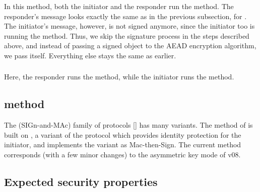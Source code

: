 
\subsubsection{\mStatStat}
In this method, both the initiator and the responder run the \mStat method. The responder's message looks exactly the same as in the previous subsection, for \mSigStat. The initiator's message, however, is not signed anymore, since the initiator too is running the \mStat method. Thus, we skip the signature process in the steps described above, and instead of passing a signed object to the AEAD encryption algorithm, we pass \mMacthree itself. Everything else stays the same as earlier.

\subsubsection{\mStatSig}
Here, the responder runs the \mSig method, while the initiator runs the \mStat method. 


\subsection{\mSigSig method}
The \mSigma (SIGn-and-MAc) family of protocols [\mcneed] has many variants. The \mSigSig method of \mEdhoc is built on \mSigmaI, a variant of the \mSigma protocol which provides identity protection for the initiator, and  implements the \mSigmaI variant as Mac-then-Sign. The current \mSigSig method corresponds (with a few minor changes) to the asymmetric key mode of \mEdhoc v08. 




\subsection{Expected security properties}




